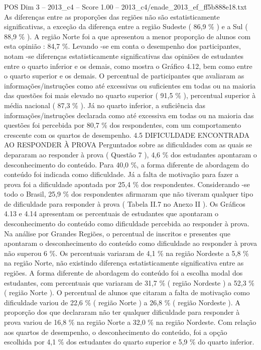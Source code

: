 \begin{textsample}{POS Dim 3 – 2013\_c4 – Score 1.00 – 2013\_c4/enade\_2013\_ef\_ff5b888e18.txt}
As diferenças entre as proporções das regiões não são estatisticamente significativas, a exceção da diferença entre a região Sudeste ( 86,9 \% ) e a Sul ( 88,9 \% ).
A região Norte foi a que apresentou a menor proporção de alunos com esta opinião : 84,7 \%.
Levando -se em conta o desempenho dos participantes, notam -se diferenças estatisticamente significativas das opiniões de estudantes entre o quarto inferior e os demais, como mostra o Gráfico 4.12, bem como entre o quarto superior e os demais.
O percentual de participantes que avaliaram as informações/instruções como até excessivas ou suficientes em todas ou na maioria das questões foi mais elevado no quarto superior ( 91,5 \% ), percentual superior à média nacional ( 87,3 \% ).
Já no quarto inferior, a suficiência das informações/instruções declarada como até excessiva em todas ou na maioria das questões foi percebida por 80,7 \% dos respondentes, com um comportamento crescente com os quartos de desempenho. 4.5 DIFICULDADE ENCONTRADA AO RESPONDER À PROVA Perguntados sobre as dificuldades com as quais se depararam ao responder à prova ( Questão 7 ), 4,6 \% dos estudantes apontaram o desconhecimento do conteúdo.
Para 40,0 \%, a forma diferente de abordagem do conteúdo foi indicada como dificuldade.
Já a falta de motivação para fazer a prova foi a dificuldade apontada por 25,4 \% dos respondentes.
Considerando -se todo o Brasil, 25,9 \% dos respondentes afirmaram que não tiveram qualquer tipo de dificuldade para responder à prova ( Tabela II.7 no Anexo II ).
Os Gráficos 4.13 e 4.14 apresentam os percentuais de estudantes que apontaram o desconhecimento do conteúdo como dificuldade percebida ao responder à prova.
Na análise por Grandes Regiões, o percentual de inscritos e presentes que apontaram o desconhecimento do conteúdo como dificuldade ao responder à prova não superou 6 \%.
Os percentuais variaram de 4,1 \% na região Nordeste a 5,8 \% na região Norte, não existindo diferença estatisticamente significativa entre as regiões.
A forma diferente de abordagem do conteúdo foi a escolha modal dos estudantes, com percentuais que variaram de 31,7 \% ( região Nordeste ) a 52,3 \% ( região Norte ).
O percentual de alunos que citaram a falta de motivação como dificuldade variou de 22,6 \% ( região Norte ) a 26,8 \% ( região Nordeste ).
A proporção dos que declararam não ter qualquer dificuldade para responder à prova variou de 16,8 \% na região Norte a 32,0 \% na região Nordeste.
Com relação aos quartos de desempenho, o desconhecimento do conteúdo, foi a opção escolhida por 4,1 \% dos estudantes do quarto superior e 5,9 \% do quarto inferior.

\end{textsample}
